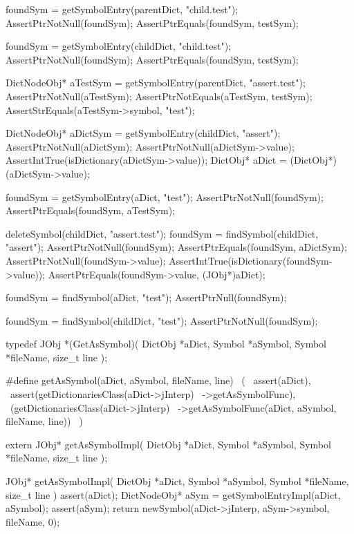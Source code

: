   foundSym = getSymbolEntry(parentDict, "child.test");
  AssertPtrNotNull(foundSym);
  AssertPtrEquals(foundSym, testSym);
  
  foundSym = getSymbolEntry(childDict, "child.test");
  AssertPtrNotNull(foundSym);
  AssertPtrEquals(foundSym, testSym);
  
  DictNodeObj* aTestSym =
    getSymbolEntry(parentDict, "assert.test");
  AssertPtrNotNull(aTestSym);
  AssertPtrNotEquals(aTestSym, testSym);
  AssertStrEquals(aTestSym->symbol, "test");
  
  DictNodeObj* aDictSym =
    getSymbolEntry(childDict, "assert");
  AssertPtrNotNull(aDictSym);
  AssertPtrNotNull(aDictSym->value);
  AssertIntTrue(isDictionary(aDictSym->value));
  DictObj* aDict = (DictObj*)(aDictSym->value);
  
  foundSym = getSymbolEntry(aDict, "test");
  AssertPtrNotNull(foundSym);
  AssertPtrEquals(foundSym, aTestSym);
  
  deleteSymbol(childDict, "assert.test");
  foundSym = findSymbol(childDict, "assert");
  AssertPtrNotNull(foundSym);
  AssertPtrEquals(foundSym, aDictSym);
  AssertPtrNotNull(foundSym->value);
  AssertIntTrue(isDictionary(foundSym->value));
  AssertPtrEquals(foundSym->value, (JObj*)aDict);
  
  foundSym = findSymbol(aDict, "test");
  AssertPtrNull(foundSym);
  
  foundSym = findSymbol(childDict, "test");
  AssertPtrNotNull(foundSym);
\stopCTest
\stopTestCase
\stopTestSuite

\startTestSuite[getAsSymbol]

\startCHeader
typedef JObj *(GetAsSymbol)(
  DictObj *aDict,
  Symbol  *aSymbol,
  Symbol  *fileName,
  size_t   line
);

#define getAsSymbol(aDict, aSymbol, fileName, line)       \
  (                                                       \
    assert(aDict),                                        \
    assert(getDictionariesClass(aDict->jInterp)           \
      ->getAsSymbolFunc),                                 \
    (getDictionariesClass(aDict->jInterp)                 \
      ->getAsSymbolFunc(aDict, aSymbol, fileName, line))  \
  )
\stopCHeader

\setCHeaderStream{private}
\startCHeader
extern JObj* getAsSymbolImpl(
  DictObj *aDict,
  Symbol  *aSymbol,
  Symbol  *fileName,
  size_t   line
);
\stopCHeader
\setCHeaderStream{public}

\startCCode
JObj* getAsSymbolImpl(
  DictObj *aDict,
  Symbol  *aSymbol,
  Symbol  *fileName,
  size_t   line
) {
  assert(aDict);
  DictNodeObj* aSym = getSymbolEntryImpl(aDict, aSymbol);
  assert(aSym);
  return newSymbol(aDict->jInterp, aSym->symbol, fileName, 0);
}
\stopCCode
\stopTestSuite

